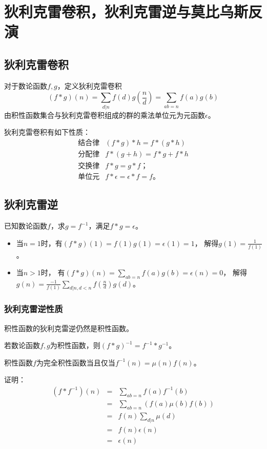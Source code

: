 \section{狄利克雷卷积，狄利克雷逆与莫比乌斯反演}
\subsection{狄利克雷卷积}
对于数论函数$f,g$，定义狄利克雷卷积
\begin{displaymath}
	(f*g)(n)=\sum_{d|n}{f(d)g(\frac{n}{d})}=\sum_{ab=n}{f(a)g(b)}
\end{displaymath}
由积性函数集合与狄利克雷卷积组成的群的乘法单位元为元函数$\epsilon$。

狄利克雷卷积有如下性质：
\begin{eqnarray*}
	\textrm{结合律} & (f*g)*h=f*(g*h)\\
	\textrm{分配律} & f*(g+h)=f*g+f*h\\
	\textrm{交换律} & f*g=g*f；\\
	\textrm{单位元} & f*\epsilon=\epsilon*f=f。
\end{eqnarray*}
\subsection{狄利克雷逆}
已知数论函数$f$，求$g=f^{-1}$，满足$f*g=\epsilon$。
\begin{itemize}
	\item 当$n=1$时，有$(f*g)(1)=f(1)g(1)=\epsilon(1)=1$，
	      解得$g(1)=\frac{1}{f(1)}$。
	\item 当$n>1$时，
	      有$\displaystyle (f*g)(n)=\sum_{ab=n}{f(a)g(b)}=\epsilon(n)=0$，
	      解得$\displaystyle g(n)=\frac{-1}{f(1)}
		      \sum_{d|n,d<n}{f(\frac{n}{d})g(d)}$。
\end{itemize}
\subsubsection{狄利克雷逆性质}
\begin{property}
	积性函数的狄利克雷逆仍然是积性函数。
\end{property}
\begin{property}
	若数论函数$f,g$为积性函数，则$(f*g)^{-1}=f^{-1}*g^{-1}$。
\end{property}
\begin{property}\label{CMFP}
	积性函数$f$为完全积性函数当且仅当$f^{-1}(n)=\mu(n)f(n)$。
\end{property}
证明：\begin{eqnarray*}
	(f*f^{-1})(n)&=&\sum_{ab=n}{f(a)f^{-1}(b)}\\
	&=&\sum_{ab=n}(f(a)\mu(b)f(b))\\
	&=&f(n)\sum_{d|n}{\mu(d)}\\
	&=&f(n)\epsilon(n)\\
	&=&\epsilon(n)
\end{eqnarray*}
